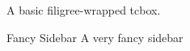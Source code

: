 \begin{ExampleBlock}{}
\begin{RpgFiligree}
    A basic filigree-wrapped tcbox.
\end{RpgFiligree}


\begin{RpgSidebar}[filigree]{Fancy Sidebar}
    A very fancy sidebar
\end{RpgSidebar}



\end{ExampleBlock}
